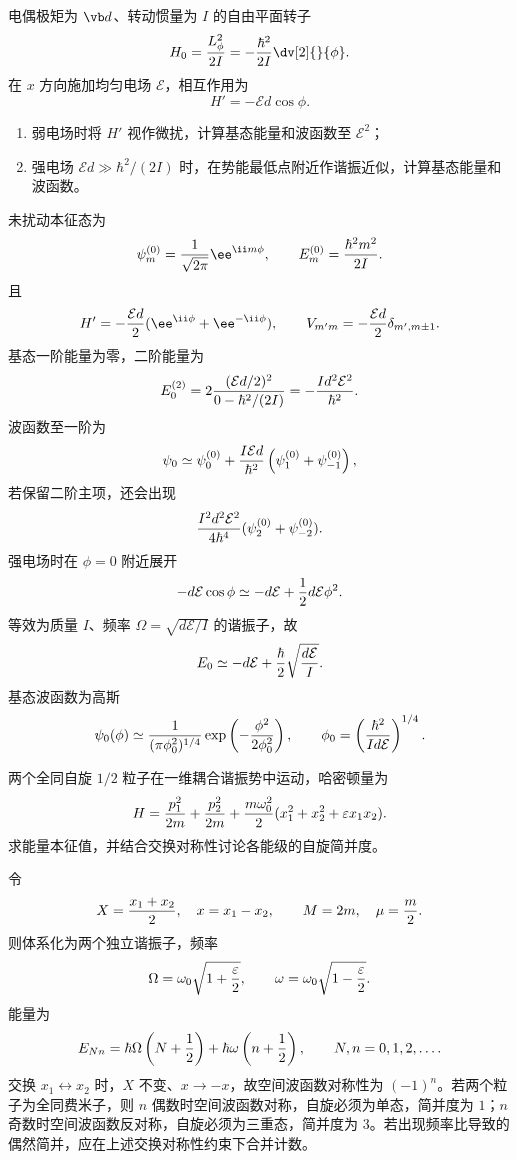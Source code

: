 
\begin{question}
电偶极矩为 $\vb d$、转动惯量为 $I$ 的自由平面转子
\[
  H_0={L_\phi^2\over2I}=-{\hbar^2\over2I}\dv[2]{}{\phi}.
\]
在 $x$ 方向施加均匀电场 $\mathcal E$，相互作用为
\[
  H'=-\mathcal E d\cos\phi.
\]
\begin{enumerate}
  \item 弱电场时将 $H'$ 视作微扰，计算基态能量和波函数至 $\mathcal E^2$；
  \item 强电场 $\mathcal Ed\gg\hbar^2/(2I)$ 时，在势能最低点附近作谐振近似，计算基态能量和波函数。
\end{enumerate}
\begin{solution}
未扰动本征态为
\[
  \psi_m^{(0)}={1\over\sqrt{2\pi}}\ee^{\ii m\phi},
  \qquad E_m^{(0)}={\hbar^2m^2\over2I}.
\]
且
\[
  H'=-{\mathcal Ed\over2}(\ee^{\ii\phi}+\ee^{-\ii\phi}),
  \qquad V_{m'm}=-{\mathcal Ed\over2}\delta_{m',m\pm1}.
\]
基态一阶能量为零，二阶能量为
\[
  E_0^{(2)}=2{(\mathcal Ed/2)^2\over 0-\hbar^2/(2I)}=-{I d^2\mathcal E^2\over\hbar^2}.
\]
波函数至一阶为
\[
  \psi_0\simeq \psi_0^{(0)}+{I\mathcal Ed\over\hbar^2}\left(\psi_1^{(0)}+\psi_{-1}^{(0)}\right),
\]
若保留二阶主项，还会出现
\[
  {I^2d^2\mathcal E^2\over4\hbar^4}(\psi_2^{(0)}+\psi_{-2}^{(0)}).
\]
强电场时在 $\phi=0$ 附近展开
\[
  -d\mathcal E\cos\phi\simeq -d\mathcal E+{1\over2}d\mathcal E\phi^2.
\]
等效为质量 $I$、频率 $\Omega=\sqrt{d\mathcal E/I}$ 的谐振子，故
\[
  E_0\simeq -d\mathcal E+{\hbar\over2}\sqrt{d\mathcal E\over I}.
\]
基态波函数为高斯
\[
  \psi_0(\phi)\simeq {1\over(\pi\phi_0^2)^{1/4}}\exp\left(-{\phi^2\over2\phi_0^2}\right),
  \qquad \phi_0=\left({\hbar^2\over Id\mathcal E}\right)^{1/4}.
\]
\end{solution}
\end{question}

\begin{question}
两个全同自旋 $1/2$ 粒子在一维耦合谐振势中运动，哈密顿量为
\[
  H={p_1^2\over2m}+{p_2^2\over2m}+{m\omega_0^2\over2}(x_1^2+x_2^2+\varepsilon x_1x_2).
\]
求能量本征值，并结合交换对称性讨论各能级的自旋简并度。
\begin{solution}
令
\[
  X={x_1+x_2\over2},\quad x=x_1-x_2,
  \qquad M=2m,
  \quad \mu={m\over2}.
\]
则体系化为两个独立谐振子，频率
\[
  \Omega=\omega_0\sqrt{1+{\varepsilon\over2}},
  \qquad \omega=\omega_0\sqrt{1-{\varepsilon\over2}}.
\]
能量为
\[
  E_{Nn}=\hbar\Omega\left(N+{1\over2}\right)+\hbar\omega\left(n+{1\over2}\right),
  \qquad N,n=0,1,2,\ldots .
\]
交换 $x_1\leftrightarrow x_2$ 时，$X$ 不变、$x\to-x$，故空间波函数对称性为 $(-1)^n$。若两个粒子为全同费米子，则 $n$ 偶数时空间波函数对称，自旋必须为单态，简并度为 $1$；$n$ 奇数时空间波函数反对称，自旋必须为三重态，简并度为 $3$。若出现频率比导致的偶然简并，应在上述交换对称性约束下合并计数。
\end{solution}
\end{question}

